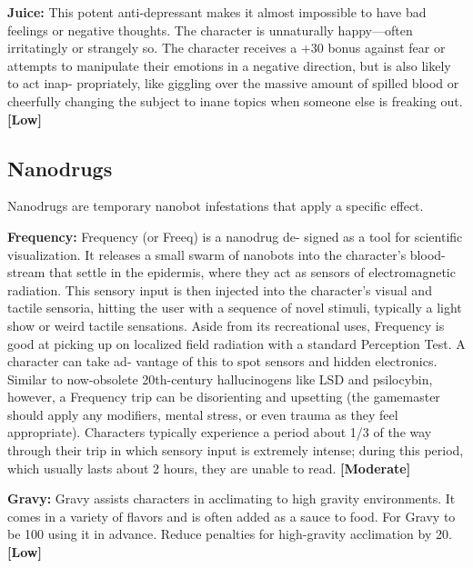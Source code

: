 \textbf{Juice:} This potent anti-depressant makes it almost 
impossible to have bad feelings or negative thoughts. 
The character is unnaturally happy—often irritatingly 
or strangely so. The character receives a +30 bonus 
against fear or attempts to manipulate their emotions 
in a negative direction, but is also likely to act inap-
propriately, like giggling over the massive amount of 
spilled blood or cheerfully changing the subject to 
inane topics when someone else is freaking out. \textbf{[Low]}

\subsection{Nanodrugs}

Nanodrugs are temporary nanobot infestations that 
apply a specific effect.

\textbf{Frequency:} Frequency (or Freeq) is a nanodrug de-
signed as a tool for scientific visualization. It releases 
a small swarm of nanobots into the character's blood-
stream that settle in the epidermis, where they act as 
sensors of electromagnetic radiation. This sensory 
input is then injected into the character's visual and 
tactile sensoria, hitting the user with a sequence of 
novel stimuli, typically a light show or weird tactile 
sensations. Aside from its recreational uses, Frequency 
is good at picking up on localized field radiation with 
a standard Perception Test. A character can take ad-
vantage of this to spot sensors and hidden electronics. 
Similar to now-obsolete 20th-century hallucinogens 
like LSD and psilocybin, however, a Frequency trip 
can be disorienting and upsetting (the gamemaster 
should apply any modifiers, mental stress, or even 
trauma as they feel appropriate). Characters typically 
experience a period about 1/3 of the way through 
their trip in which sensory input is extremely intense; 
during this period, which usually lasts about 2 hours, 
they are unable to read. \textbf{[Moderate]}

\textbf{Gravy:} Gravy assists characters in acclimating to 
high gravity environments. It comes in a variety of 
flavors and is often added as a sauce to food. For 
Gravy to be 100%
using it in advance. Reduce penalties for high-gravity 
acclimation by 20. \textbf{[Low]}

